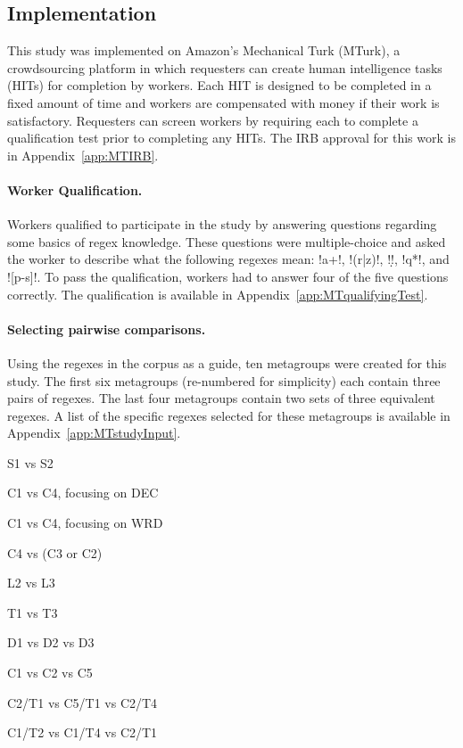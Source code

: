 \subsection{Implementation}
This study was implemented on Amazon's Mechanical Turk (MTurk),  a crowdsourcing platform in which requesters can create human intelligence tasks (HITs) for completion by workers. Each HIT is designed to be completed in a fixed amount of time and workers are compensated with money if their work is satisfactory.  Requesters can screen workers by requiring each to complete a qualification test prior to completing any HITs.  The IRB approval for this work is in Appendix~\ref{app:MTIRB}.

\paragraph{Worker Qualification.} Workers qualified to participate in the study by answering questions regarding some basics of regex knowledge. These questions were multiple-choice and asked the worker to describe what the following regexes mean: \cverb!a+!, \cverb!(r|z)!, \cverb!\d!, \cverb!q*!, and \cverb![p-s]!. To pass the qualification, workers had to answer four of the five questions correctly.  The qualification is available in Appendix~\ref{app:MTqualifyingTest}.

\paragraph{Selecting pairwise comparisons.}  Using the regexes in the corpus as a guide, ten metagroups were created for this study.  The first six metagroups (re-numbered for simplicity) each contain three pairs of regexes.  The last four metagroups contain two sets of three equivalent regexes.  A list of the specific regexes selected for these metagroups is available in Appendix~\ref{app:MTstudyInput}.

\begin{multicols}{2}
\begin{description}[noitemsep,topsep=0pt]
\item[M1]  S1 vs S2
\item[M2]  C1 vs C4, focusing on DEC
\item[M3]  C1 vs C4, focusing on WRD
\item[M4]  C4 vs (C3 or C2)
\item[M5]  L2 vs L3
\item[M6]  T1 vs T3
\item[M7]  D1 vs D2 vs D3
\item[M8]  C1 vs C2 vs C5
\item[M9]  C2/T1 vs C5/T1 vs C2/T4
\item[M10] C1/T2 vs C1/T4 vs C2/T1
\end{description}
\end{multicols}

